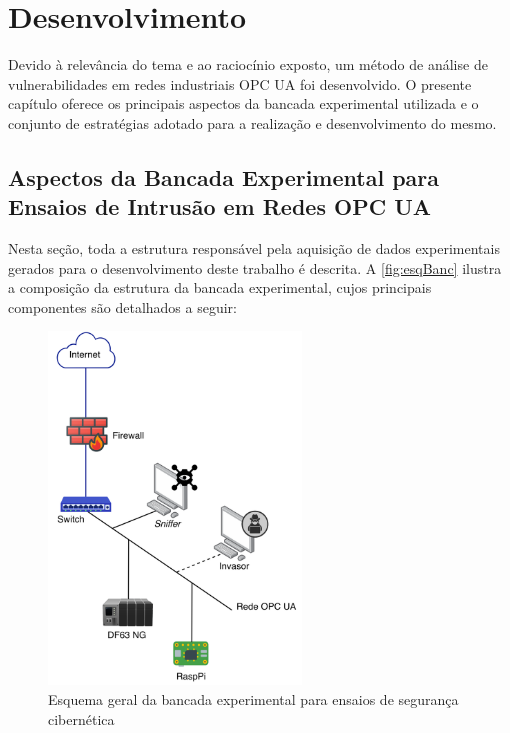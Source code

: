 \chapter{Desenvolvimento} \label{cap:desenvolvimento}

Devido à relevância do tema e ao raciocínio exposto, um método de análise de vulnerabilidades em redes industriais OPC UA foi desenvolvido. O presente capítulo oferece os principais aspectos da bancada experimental utilizada e o conjunto de estratégias adotado para a realização e desenvolvimento do mesmo.

\section{Aspectos da Bancada Experimental para Ensaios de Intrusão em Redes OPC UA}

    Nesta seção, toda a estrutura responsável pela aquisição de dados experimentais gerados para o desenvolvimento deste trabalho é descrita. A \autoref{fig:esqBanc} ilustra a composição da estrutura da bancada experimental, cujos principais componentes são detalhados a seguir:

    \begin{figure}[htbp]
        \caption{\label{fig:esqBanc}Esquema geral da bancada experimental para ensaios de segurança cibernética}
        \begin{center}
            \includegraphics[width=0.6\textwidth]{USPSC-img/bancada.png}
        \end{center}
    \end{figure}

